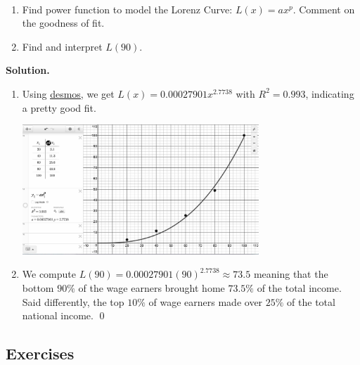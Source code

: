 \documentclass{ximera}
\begin{document}
\begin{example} \label{LorenzEx}  $~$

\begin{enumerate}

\item Find power function to model the Lorenz Curve: $L(x) = ax^p$.  Comment on the goodness of fit.  

\item Find and interpret $L(90)$.

\end{enumerate}

{\bf Solution.}  

\begin{enumerate}

\item Using \href{https://www.desmos.com/}{\underline{desmos}}, we get $L(x) = 0.00027901x^{2.7738}$ with $R^2 = 0.993$, indicating a pretty good fit.  

\begin{center}

\includegraphics[width=3.5in]{./PowerFunctionsGraphics/LorenzEx.jpg}

\end{center}


\item We compute $L(90) = 0.00027901(90)^{2.7738} \approx 73.5$ meaning that the bottom $90 \%$ of the wage earners brought home $73.5 \%$ of the total income.  Said differently, the top $10 \%$ of wage earners made over $25 \%$ of the total national income.  \qed


\end{enumerate}


 
\end{example}

\newpage

\subsection{Exercises}


\closegraphsfile
\end{document}
